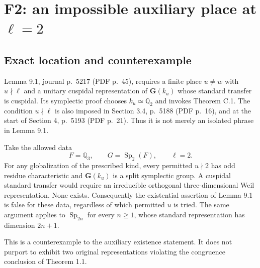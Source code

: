 \documentclass[10pt]{article}
\begin{document}
\section*{F2: an impossible auxiliary place at \(\ell=2\)}
\subsection*{Exact location and counterexample}
Lemma 9.1, journal p. 5217 (PDF p. 45), requires a finite place \(u\ne w\) with \(u\nmid\ell\) and a unitary cuspidal representation of \(\mathbf G(k_u)\) whose standard transfer is cuspidal. Its symplectic proof chooses \(k_u\simeq\mathbb Q_2\) and invokes Theorem C.1. The condition \(u\nmid\ell\) is also imposed in Section 3.4, p. 5188 (PDF p. 16), and at the start of Section 4, p. 5193 (PDF p. 21). Thus it is not merely an isolated phrase in Lemma 9.1.\par
Take the allowed data \[F=\mathbb Q_3,\qquad G=\operatorname{Sp}_2(F),\qquad \ell=2.\] For any globalization of the prescribed kind, every permitted \(u\nmid2\) has odd residue characteristic and \(\mathbf G(k_u)\) is a split symplectic group. A cuspidal standard transfer would require an irreducible orthogonal three-dimensional Weil representation. None exists. Consequently the existential assertion of Lemma 9.1 is false for these data, regardless of which permitted \(u\) is tried. The same argument applies to \(\operatorname{Sp}_{2n}\) for every \(n\ge1\), whose standard representation has dimension \(2n+1\).\par
This is a counterexample to the auxiliary existence statement. It does not purport to exhibit two original representations violating the congruence conclusion of Theorem 1.1.\par
\end{document}
